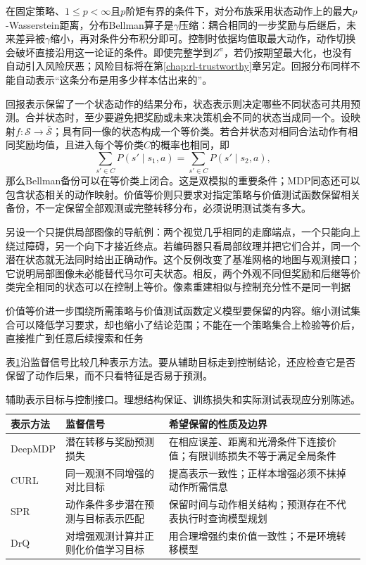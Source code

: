在固定策略、$1\leq p<\infty$且$p$阶矩有界的条件下，对分布族采用状态动作上的最大$p$-Wasserstein距离，分布Bellman算子是$\gamma$压缩：耦合相同的一步奖励与后继后，未来差异被$\gamma$缩小，再对条件分布积分即可。控制时依据均值取最大动作，动作切换会破坏直接沿用这一论证的条件。即使完整学到$Z^\pi$，若仍按期望最大化，也没有自动引入风险厌恶；风险目标将在第\ref{chap:rl-trustworthy}章另定。回报分布同样不能自动表示“这条分布是用多少样本估出来的”。

回报表示保留了一个状态动作的结果分布，状态表示则决定哪些不同状态可共用预测。合并状态时，至少要避免把奖励或未来决策机会不同的状态当成同一个。设映射$f:\mathcal S\to\bar{\mathcal S}$；具有同一像的状态构成一个等价类。若合并状态对相同合法动作有相同奖励均值，且进入每个等价类$C$的概率也相同，即
\[
  \sum_{s'\in C}P(s'\mid s_1,a)
       =\sum_{s'\in C}P(s'\mid s_2,a),
\]
那么Bellman备份可以在等价类上闭合。这是双模拟的重要条件；MDP同态还可以包含状态相关的动作映射。价值等价则只要求对指定策略与价值测试函数保留相关备份，不一定保留全部观测或完整转移分布，必须说明测试类有多大。

另设一个只提供局部图像的导航例：两个视觉几乎相同的走廊端点，一个只能向上绕过障碍，另一个向下才接近终点。若编码器只看局部纹理并把它们合并，同一个潜在状态就无法同时给出正确动作。这个反例改变了基准网格的地图与观测接口；它说明局部图像未必能替代马尔可夫状态。相反，两个外观不同但奖励和后继等价类完全相同的状态可以在控制上等价。像素重建相似与控制充分性不是同一判据

价值等价进一步围绕所需策略与价值测试函数定义模型要保留的内容。缩小测试集合可以降低学习要求，却也缩小了结论范围；不能在一个策略集合上检验等价后，直接推广到任意后续搜索和任务

表\ref{tab:rl-learning-representations}沿监督信号比较几种表示方法。要从辅助目标走到控制结论，还应检查它是否保留了动作后果，而不只看特征是否易于预测。

\begin{table}[t]
  \centering
  \small
  \begin{tabularx}{\linewidth}{>{\raggedright\arraybackslash}p{22mm} >{\raggedright\arraybackslash}X >{\raggedright\arraybackslash}X}
    \toprule
    表示方法 & 监督信号 & 希望保留的性质及边界 \\
    \midrule
    DeepMDP & 潜在转移与奖励预测损失 & 在相应误差、距离和光滑条件下连接价值；有限训练损失不等于满足全局条件 \\
    CURL & 同一观测不同增强的对比目标 & 提高表示一致性；正样本增强必须不抹掉动作所需信息 \\
    SPR & 动作条件多步潜在预测与目标表示匹配 & 保留时间与动作相关结构；预测存在不代表执行时查询模型规划 \\
    DrQ & 对增强观测计算并正则化价值学习目标 & 用合理增强约束价值一致性；不是环境转移模型 \\
    \bottomrule
  \end{tabularx}
  \caption{辅助表示目标与控制接口。理想结构保证、训练损失和实际测试表现应分别陈述。}
  \label{tab:rl-learning-representations}
\end{table}

